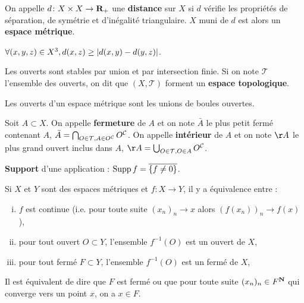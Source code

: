 \begin{defn}
	On appelle $d \colon X \times X \to \mathbf{R}_+$ une \textbf{distance} sur $X$ si $d$ vérifie les propriétés de séparation, de symétrie et d'inégalité triangulaire.
	$X$ muni de $d$ est alors un \textbf{espace métrique}.
\end{defn}

\begin{pop}
	$\forall (x,y,z) \in X^3, d(x,z) \geq \left\lvert d(x,y) - d(y,z)\right\rvert$.
\end{pop}

\begin{pop}
	Les ouverts sont stables par union et par intersection finie. Si on note $\mathcal{T}$ l'ensemble des ouverts, on dit que $(X,\mathcal{T})$ forment un \textbf{espace topologique}.
\end{pop}

\begin{pop}
	Les ouverts d'un espace métrique sont les unions de boules ouvertes.
\end{pop}

\begin{defn}
	Soit $A \subset X$.
	On appelle \textbf{fermeture} de $A$ et on note $\bar{A}$ le plus petit fermé contenant $A$, $\bar{A} = \bigcap_{O \in \mathcal{T}, A \in {O}^{\mathcal{C}}} {O}^{\mathcal{C}}$.
	On appelle \textbf{intérieur} de $A$ et on note $\AA$ le plus grand ouvert inclus dans $A$, $\AA = \bigcup_{O \in \mathcal{T}, O \in A} \compl{O}$.
\end{defn}

\begin{defn}
	\textbf{Support} d'une application : $\operatorname{Supp} f = \overline{\{ f \neq 0\} }$.
\end{defn}

\begin{pop}
	Si $X$ et $Y$ sont des espaces métriques et $f \colon X \to Y$, il y a équivalence entre :
	\begin{enumerate}[(i)]
		\item $f$ est continue (i.e. pour toute suite $(x_n)_n \to x$ alors $(f(x_n))_n \to f(x)$),
		\item pour tout ouvert $O \subset Y$, l'ensemble $f^{-1}(O)$ est un ouvert de $X$,
		\item pour tout fermé $F \subset Y$, l'ensemble $f^{-1}(O)$ est un fermé de $X$,
	\end{enumerate}
\end{pop}

\begin{pop}
	Il est équivalent de dire que $F$ est fermé ou que pour toute suite $(x_n)_n \in F^{\mathbf{N}}$ qui converge vers un point $x$, on a $x \in F$.
\end{pop}

